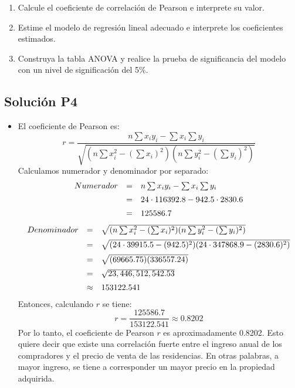 \documentclass[12pt,a4paper]{article}
\begin{document}
\begin{enumerate}[label=\alph{enumi})]
    \item Calcule el coeficiente de correlación de Pearson e interprete su valor.
    \item Estime el modelo de regresión lineal adecuado e interprete los coeficientes estimados.
    \item Construya la tabla ANOVA y realice la prueba de significancia del modelo con un nivel de significación del 5\%.
\end{enumerate}

\subsection*{Solución P4}
\begin{itemize}
	\item [a)] El coeficiente de Pearson es:
        $$
            r = \frac{n\sum x_i y_i - \sum x_i \sum y_i}{\sqrt{(n\sum x_i^2 - (\sum x_i)^2)(n\sum y_i^2 - (\sum y_i)^2)}}
        $$
        Calculamos numerador y denominador por separado:
        $$
        \begin{array}{r c l}
             Numerador & = & n\sum x_i y_i - \sum x_i \sum y_i \\
             \noalign{\vspace{5pt}}
             & = & 24 \cdot 116392.8 - 942.5 \cdot 2830.6 \\
             \noalign{\vspace{5pt}}
             & = & 125586.7
        \end{array}
        $$
        $$
        \begin{array}{r c l}
             Denominador & = & \sqrt{(n\sum x_i^2 - (\sum x_i)^2)(n\sum y_i^2 - (\sum y_i)^2)} \\
             \noalign{\vspace{5pt}}
             & = &  \sqrt{(24 \cdot 39915.5 - (942.5)^2)(24 \cdot 347868.9 - (2830.6)^2)} \\
             \noalign{\vspace{5pt}}
             & = & \sqrt{(69665.75)(336557.24)} \\
             \noalign{\vspace{5pt}}
             & = & \sqrt{23,446,512,542.53} \\
             \noalign{\vspace{5pt}}
             & \approx & 153122.541
        \end{array}
        $$
        Entonces, calculando $r$ se tiene:
        $$
        r = \dfrac{125586.7}{153122.541} \approx 0.8202
        $$
        \newline
        Por lo tanto, el coeficiente de Pearson $r$ es aproximadamente 0.8202. Esto quiere decir que existe una correlación fuerte entre el ingreso anual de los compradores y el precio de venta de las residencias. En otras palabras, a mayor ingreso, se tiene a corresponder un mayor precio en la propiedad adquirida.
	

\end{itemize}
\end{document}
